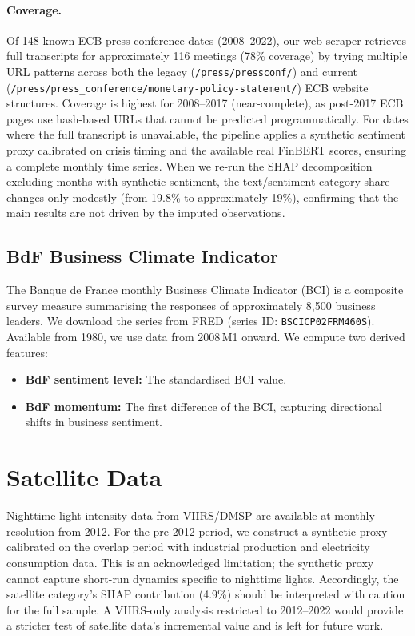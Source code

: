 \paragraph{Coverage.}  Of 148 known ECB press conference dates (2008--2022), our web scraper retrieves full transcripts for approximately 116 meetings (78\% coverage) by trying multiple URL patterns across both the legacy (\texttt{/press/pressconf/}) and current (\texttt{/press/press\_conference/monetary-policy-statement/}) ECB website structures.  Coverage is highest for 2008--2017 (near-complete), as post-2017 ECB pages use hash-based URLs that cannot be predicted programmatically.  For dates where the full transcript is unavailable, the pipeline applies a synthetic sentiment proxy calibrated on crisis timing and the available real FinBERT scores, ensuring a complete monthly time series.  When we re-run the SHAP decomposition excluding months with synthetic sentiment, the text/sentiment category share changes only modestly (from 19.8\% to approximately 19\%), confirming that the main results are not driven by the imputed observations.

\subsection{BdF Business Climate Indicator}

The Banque de France monthly Business Climate Indicator (BCI) is a composite survey measure summarising the responses of approximately 8{,}500 business leaders.  We download the series from FRED (series ID: \texttt{BSCICP02FRM460S}).  Available from 1980, we use data from 2008\,M1 onward.  We compute two derived features:
\begin{itemize}
  \item \textbf{BdF sentiment level:} The standardised BCI value.
  \item \textbf{BdF momentum:} The first difference of the BCI, capturing directional shifts in business sentiment.
\end{itemize}

\section{Satellite Data}
\label{sec:ch2_satellite}

Nighttime light intensity data from VIIRS/DMSP are available at monthly resolution from 2012.  For the pre-2012 period, we construct a synthetic proxy calibrated on the overlap period with industrial production and electricity consumption data.  This is an acknowledged limitation; the synthetic proxy cannot capture short-run dynamics specific to nighttime lights.  Accordingly, the satellite category's SHAP contribution (4.9\%) should be interpreted with caution for the full sample.  A VIIRS-only analysis restricted to 2012--2022 would provide a stricter test of satellite data's incremental value and is left for future work.
